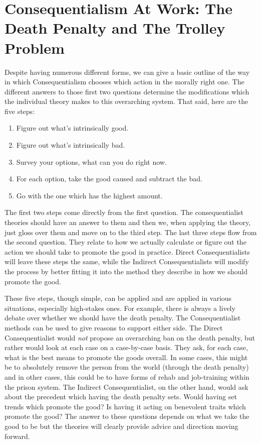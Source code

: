 \section{Consequentialism At Work: The Death Penalty and The Trolley Problem}
Despite having numerous different forms, we can give a basic outline of the way in which Consequentialism chooses which action in the morally right one. The different answers to those first two questions determine the modifications which the individual theory makes to this overarching system. That said, here are the five steps: 

\begin{enumerate}
    \item Figure out what’s intrinsically good.
    \item Figure out what’s intrinsically bad.
    \item Survey your options, what can you do right now.
    \item For each option, take the good caused and subtract the bad.
    \item Go with the one which has the highest amount.
\end{enumerate}

The first two steps come directly from the first question. The consequentialist theories should have an answer to them and then we, when applying the theory, just gloss over them and move on to the third step. The last three steps flow from the second question. They relate to how we actually calculate or figure out the action we should take to promote the good in practice. Direct Consequentialists will leave these steps the same, while the Indirect Consequentialists will modify the process by better fitting it into the method they describe in how we should promote the good. 

These five steps, though simple, can be applied and are applied in various situations, especially high-stakes ones. For example, there is always a lively debate over whether we should have the death penalty. The Consequentialist methods can be used to give reasons to support either side. The Direct Consequentialist would \emph{not} propose an overarching ban on the death penalty, but rather would look at each case on a case-by-case basis. They ask, for each case, what is the best means to promote the goods overall. In some cases, this might be to absolutely remove the person from the world (through the death penalty) and in other cases, this could be to have forms of rehab and job-training within the prison system. The Indirect Consequentialist, on the other hand, would ask about the precedent which having the death penalty sets. Would having set trends which promote the good? Is having it acting on benevolent traits which promote the good? The answer to these questions depends on what we take the good to be but the theories will clearly provide advice and direction moving forward. 


